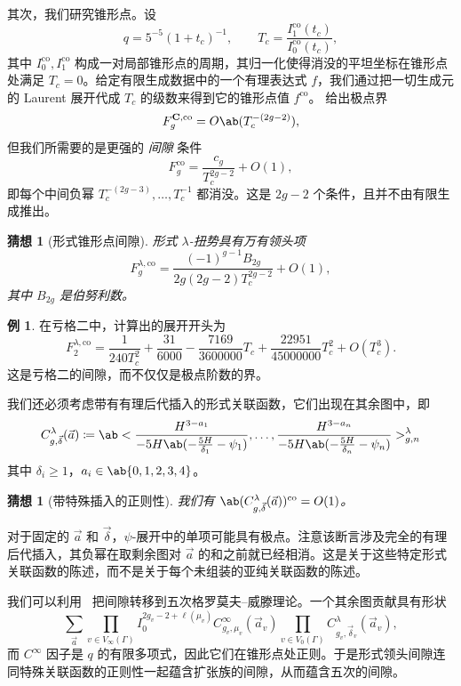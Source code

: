 \documentclass{amsart}
\newtheorem{conj}[thm]{猜想}
\theoremstyle{definition}
\newtheorem{exm}[thm]{例}
\theoremstyle{remark}
\theoremstyle{plain}
\theoremstyle{definition}
\theoremstyle{remark}
\newcommand{\mbf}[1]{\mathbf{#1}}
\newcommand{\mr}[1]{\mathrm{#1}}
\newcommand{\1}{\mathbf{1}}
\newcommand{\2}{\mathbf{2}}
\newcommand{\3}{\mathbf{3}}
\begin{document}
其次，我们研究锥形点。设
\[ q = 5^{-5}(1+t_c)^{-1}, \qquad T_c = \frac{I_1^{\mr{co}}(t_c)}{I_0^{\mr{co}}(t_c)}, \]
其中 \(I_0^{\mr{co}}, I_1^{\mr{co}}\) 构成一对局部锥形点的周期，其归一化使得消没的平坦坐标在锥形点处满足 \(T_c = 0\)。给定有限生成数据中的一个有理表达式 \(f\)，我们通过把一切生成元的 Laurent 展开代成 \(T_c\) 的级数来得到它的锥形点值 \(f^{\mr{co}}\)。 给出极点界
\[ F_g^{\mbf{C},\mr{co}} = O\ab(T_c^{-(2g-2)}), \]
但我们所需要的是更强的 \textit{间隙} 条件
\[ F_g^{\mr{co}} = \frac{c_g}{T_c^{2g-2}} + O(1), \]
即每个中间负幂 \(T_c^{-(2g-3)}, \ldots, T_c^{-1}\) 都消没。这是 \(2g-2\) 个条件，且并不由有限生成推出。

\begin{conj}[形式锥形点间隙]%
\label{conj:formal conifold gap}
    形式 \(\lambda\)-扭势具有万有领头项
    \[ F_g^{\lambda,\mr{co}} = \frac{(-1)^{g-1}B_{2g}}{2g(2g-2)T_c^{2g-2}} + O(1), \]
    其中 \(B_{2g}\) 是伯努利数。
\end{conj}

\begin{exm}
    在亏格二中，计算出的展开开头为
    \[ F_2^{\lambda,\mr{co}} = \frac{1}{240T_c^2} + \frac{31}{6000} - \frac{7169}{3600000}T_c + \frac{22951}{45000000}T_c^2 + O(T_c^3). \]
    这是亏格二的间隙，而不仅仅是极点阶数的界。
\end{exm}

我们还必须考虑带有有理后代插入的形式关联函数，它们出现在其余图中，即
\[ C^{\lambda}_{g,\vec{\delta}}(\vec{a}) \coloneqq \ab< \frac{H^{3-a_1}}{-5H\ab(-\frac{5H}{\delta_1}-\psi_1)}, \ldots, \frac{H^{3-a_n}}{-5H\ab(-\frac{5H}{\delta_n}-\psi_n)}>^{\lambda}_{g,n} \]
其中 \(\delta_i \geq 1\)，\(a_i \in \ab\{0,1,2,3,4\}\)。

\begin{conj}[带特殊插入的正则性]%
\label{conj:special correlator regularity}
    我们有 \(\ab(C^{\lambda}_{g,\vec{\delta}}(\vec{a}))^{\mr{co}} = O(1)\)。
\end{conj}

对于固定的 \(\vec{a}\) 和 \(\vec{\delta}\)，\(\psi\)-展开中的单项可能具有极点。注意该断言涉及完全的有理后代插入，其负幂在取剩余图对 \(\vec{a}\) 的和之前就已经相消。这是关于这些特定形式关联函数的陈述，而不是关于每个未组装的亚纯关联函数的陈述。

我们可以利用~ 把间隙转移到五次格罗莫夫–威滕理论。一个其余图贡献具有形状
\[ \sum_{\vec{a}} \prod_{v \in V_{\infty}(\Gamma)}I_0^{2g_v-2+\ell(\mu_v)}C^{\infty}_{g_v,\mu_v}(\vec{a}_v)\prod_{v\in V_0(\Gamma)}C^{\lambda}_{g_v,\vec{\delta}_v}(\vec{a}_v), \]
而 \(C^{\infty}\) 因子是 \(q\) 的有限多项式，因此它们在锥形点处正则。于是形式领头间隙连同特殊关联函数的正则性一起蕴含扩张族的间隙，从而蕴含五次的间隙。
\end{document}
